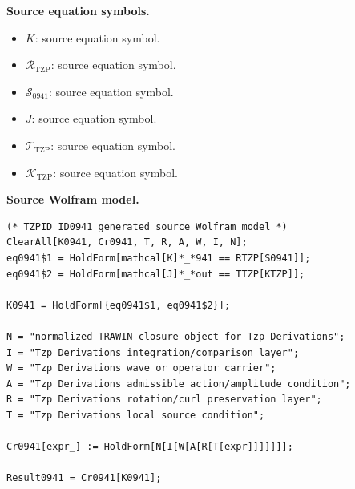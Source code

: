 \begin{minipage}[t]{0.49\linewidth}
\begingroup
\small
\raggedright
\textbf{Source equation symbols.}\par
\begin{itemize}[leftmargin=1.35em,itemsep=1pt,topsep=1pt,parsep=0pt]
    \item $K$: source equation symbol.
    \item $\mathcal{R}_{\mathrm{TZP}}$: source equation symbol.
    \item $\mathcal{S}_{0941}$: source equation symbol.
    \item $J$: source equation symbol.
    \item $\mathcal{T}_{\mathrm{TZP}}$: source equation symbol.
    \item $\mathcal{K}_{\mathrm{TZP}}$: source equation symbol.
\end{itemize}
\endgroup
\end{minipage}\hfill
\begin{minipage}[t]{0.47\linewidth}
\begingroup
\scriptsize
\raggedright
\textbf{Source Wolfram model.}\par
\begin{Verbatim}[fontsize=\tiny,breaklines=true,breakanywhere=true]
(* TZPID ID0941 generated source Wolfram model *)
ClearAll[K0941, Cr0941, T, R, A, W, I, N];
eq0941$1 = HoldForm[mathcal[K]*_*941 == RTZP[S0941]];
eq0941$2 = HoldForm[mathcal[J]*_*out == TTZP[KTZP]];

K0941 = HoldForm[{eq0941$1, eq0941$2}];

N = "normalized TRAWIN closure object for Tzp Derivations";
I = "Tzp Derivations integration/comparison layer";
W = "Tzp Derivations wave or operator carrier";
A = "Tzp Derivations admissible action/amplitude condition";
R = "Tzp Derivations rotation/curl preservation layer";
T = "Tzp Derivations local source condition";

Cr0941[expr_] := HoldForm[N[I[W[A[R[T[expr]]]]]]];

Result0941 = Cr0941[K0941];
\end{Verbatim}
\endgroup
\end{minipage}

